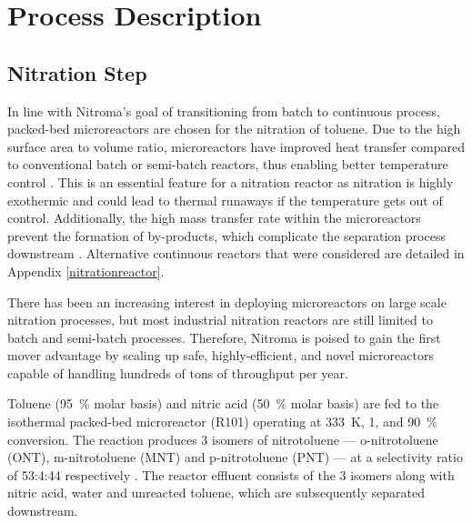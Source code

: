 \section{Process Description}
\label{sec:process}
\subsection{Nitration Step}
In line with Nitroma's goal of transitioning from batch to continuous process, packed-bed microreactors are chosen for the nitration of toluene. Due to the high surface area to volume ratio, microreactors have improved heat transfer compared to conventional batch or semi-batch reactors, thus enabling better temperature control \cite{halder_nitration_2007}. This is an essential feature for a nitration reactor as nitration is highly exothermic and could lead to thermal runaways if the temperature gets out of control. Additionally, the high mass transfer rate within the microreactors prevent the formation of by-products, which complicate the separation process downstream \cite{halder_nitration_2007}.
Alternative continuous reactors that were considered are detailed in Appendix \ref{nitrationreactor}. 

There has been an increasing interest in deploying microreactors on large scale nitration processes, but most industrial nitration reactors are still limited to batch and semi-batch processes. Therefore, Nitroma is poised to gain the first mover advantage by scaling up safe, highly-efficient, and novel microreactors capable of handling hundreds of tons of throughput per year.

Toluene (\SI{95}{\percent} molar basis) and nitric acid (\SI{50}{\percent} molar basis) are fed to the isothermal packed-bed microreactor (R101) operating at \SI{333}{\K}, \SI{1}{\atm}, and \SI{90}{\percent} conversion. The reaction produces 3 isomers of nitrotoluene --- o-nitrotoluene (ONT), m-nitrotoluene (MNT) and p-nitrotoluene (PNT) --- at a selectivity ratio of 53:4:44 respectively \cite{smith_novel_1998}. The reactor effluent consists of the 3 isomers along with nitric acid, water and unreacted toluene, which are subsequently separated downstream.


